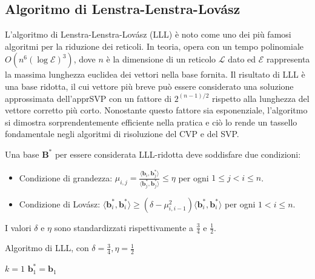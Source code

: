 \subsection{Algoritmo di Lenstra-Lenstra-Lovász}
L'algoritmo di Lenstra-Lenstra-Lovász (LLL)\cite{LLL82,HDMRD08} è noto come uno dei più famosi algoritmi per 
la riduzione dei reticoli. 
In teoria, opera con un tempo polinomiale $O(n^6 (\log\mathcal{E})^3)$, dove $n$ è la dimensione di un 
reticolo $\mathcal{L}$ dato ed $\mathcal{E}$ rappresenta la massima lunghezza euclidea dei vettori nella base 
fornita. Il risultato di LLL è una base ridotta, il cui vettore più breve può essere 
considerato una soluzione approssimata dell'apprSVP con un fattore di $2^{(n-1)/2}$ rispetto 
alla lunghezza del vettore corretto più corto. Nonostante questo fattore sia 
esponenziale, l'algoritmo si dimostra sorprendentemente efficiente nella pratica e ciò lo rende
un tassello fondamentale negli algoritmi di risoluzione del CVP e del SVP. 

Una base $\mathbf{B}^*$ per essere considerata LLL-ridotta deve soddisfare due condizioni:
\begin{itemize}
    \item Condizione di grandezza: $\mu_{i,j} = \frac{\langle \mathbf{b}_i,\mathbf{b}_j^* \rangle}
    {\langle \mathbf{b}_j^*,\mathbf{b}_j^* \rangle}  
    \leq \eta$ per ogni $1\leq j < i \leq n$.
    \item Condizione di Lovász: $\langle \mathbf{b}_i^*,\mathbf{b}_i^* \rangle \geq 
    (\delta- \mu^2_{i,i-1}) \langle \mathbf{b}_{i}^*,\mathbf{b}_{i}^* \rangle$
    per ogni $1 < i \leq n$.
\end{itemize}
I valori $\delta$ e $\eta$ sono standardizzati rispettivamente a $\frac{3}{4}$ e $\frac{1}{2}$.

\begin{algorithm}
    \caption{Algoritmo di LLL, con $\delta = \frac{3}{4}, \eta=\frac{1}{2}$}
    \label{alg:two}
    \DontPrintSemicolon
    $k=1$\;
    $\mathbf{b}_1^* = \mathbf{b}_1$\;

\end{algorithm}

